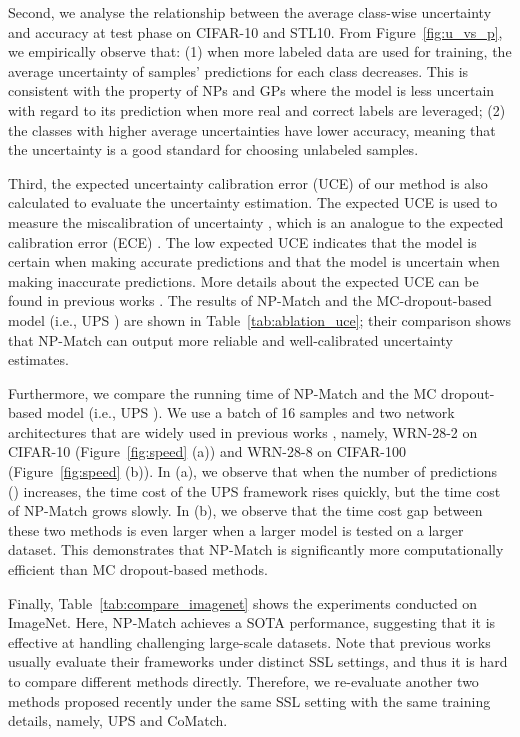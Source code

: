 \documentclass[nohyperref]{article}
\theoremstyle{plain}
\theoremstyle{definition}
\theoremstyle{remark}
\begin{document}
Second, we analyse the relationship between the average class-wise uncertainty and accuracy at test phase on CIFAR-10 and STL10. From Figure~\ref{fig:u_vs_p}, we empirically observe that: (1) when more labeled data are used for training, the average uncertainty of samples' predictions for each class decreases. This is consistent with the property of NPs and GPs where the model is less uncertain with regard to its prediction when more real and correct labels are leveraged; (2) the classes with higher average uncertainties have lower accuracy, meaning that the uncertainty is a good standard for choosing unlabeled samples. 
 
 
 
Third, the expected uncertainty calibration error (UCE) of our method is also calculated to evaluate the uncertainty estimation. The expected UCE is used to measure the miscalibration of uncertainty \cite{laves2020calibration}, which is an analogue to the expected calibration error (ECE) \cite{guo2017calibration, naeini2015obtaining}. The low expected UCE indicates that the model is certain when making accurate predictions and that the model is uncertain when making inaccurate predictions. More details about the expected UCE can be found in previous works \cite{laves2020calibration, krishnan2020improving}. The results of NP-Match and the MC-dropout-based model (i.e., UPS \cite{rizve2021defense}) are shown in Table~\ref{tab:ablation_uce}; their comparison shows that NP-Match can output more reliable and well-calibrated uncertainty estimates. 


Furthermore, we compare the running time of NP-Match and the MC dropout-based model (i.e., UPS  \cite{rizve2021defense}). We use a batch of 16 samples and two network architectures that are widely used in previous works \cite{zagoruyko2016wide, zhang2021flexmatch, sohn2020fixmatch, li2021comatch}, namely, WRN-28-2 on CIFAR-10 (Figure~\ref{fig:speed} (a)) and WRN-28-8 on CIFAR-100 (Figure~\ref{fig:speed} (b)).
In (a), we observe that when the number of predictions () increases,  the time cost of the UPS framework rises quickly, but the time cost of NP-Match grows slowly. In (b), we observe that the time cost gap between these two methods is even larger when a larger model is tested on a larger dataset. This demonstrates that NP-Match is significantly more computationally efficient than MC dropout-based methods. 
 
Finally, Table~\ref{tab:compare_imagenet} shows the experiments conducted on ImageNet. Here, NP-Match achieves a SOTA  performance, suggesting that it is effective at handling challenging large-scale datasets. Note that previous works usually evaluate their frameworks under distinct SSL settings, and thus it is hard to compare different methods directly. Therefore, we re-evaluate another two methods proposed recently under the same SSL setting with the same training details, namely, UPS and CoMatch. 
 
\end{document}

